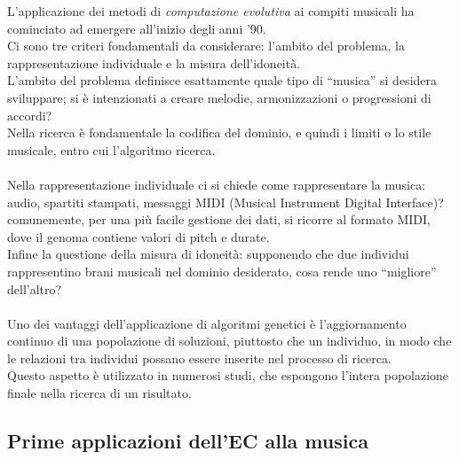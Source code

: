 \documentclass[a4paper,12pt]{report}
\begin{document}
L'applicazione dei metodi di \textit{computazione evolutiva} ai compiti musicali ha cominciato ad emergere all'inizio degli anni '90. \\
Ci sono tre criteri fondamentali da considerare: l'ambito del problema, la rappresentazione individuale e la misura dell'idoneità. \\
L’ambito del problema definisce esattamente quale tipo di “musica” si desidera sviluppare; si è intenzionati a creare melodie, armonizzazioni o progressioni di accordi? \\
Nella ricerca è fondamentale la codifica del dominio, e quindi i limiti o lo stile musicale, entro cui l'algoritmo ricerca. \\
\\
Nella rappresentazione individuale ci si chiede come rappresentare la musica: audio, spartiti stampati, messaggi MIDI (Musical Instrument Digital Interface)? \\
comunemente, per una più facile gestione dei dati, si ricorre al formato MIDI, dove il genoma contiene valori di pitch e durate. \\
Infine la questione della misura di idoneità: supponendo che due individui rappresentino brani musicali nel dominio desiderato, cosa rende uno “migliore” dell’altro? \\
\\
Uno dei vantaggi dell'applicazione di algoritmi genetici è l'aggiornamento continuo di una popolazione di soluzioni, piuttosto che un individuo, in modo che le relazioni tra individui possano essere inserite nel processo di ricerca. \\
Questo aspetto è utilizzato in numerosi studi, che espongono l'intera popolazione finale nella ricerca di un risultato. 

\subsection{Prime applicazioni dell'EC alla musica}
\end{document}
